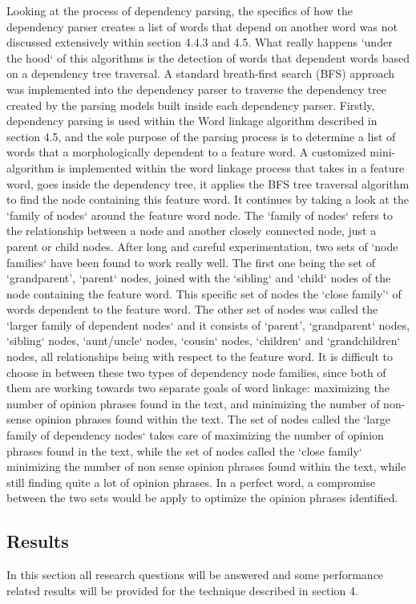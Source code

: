 \documentclass{sig-alternate}
\begin{document}
Looking at the process of dependency parsing, the specifics of how the dependency parser creates a list of words that depend on another word was not discussed extensively within section 4.4.3 and 4.5. What really happens `under the hood` of this algorithms is the detection of words that dependent words based on a dependency tree traversal. A standard breath-first search (BFS) approach was implemented into the dependency parser to traverse the dependency tree created by the parsing models built inside each dependency parser. Firstly, dependency parsing is used within the Word linkage algorithm described in section 4.5, and the sole purpose of the parsing process is to determine a list of words that a morphologically dependent to a feature word. A customized mini-algorithm is implemented within the word linkage process that takes in a feature word, goes inside the dependency tree, it applies the BFS tree traversal algorithm to find the node containing this feature word. It continues by taking a look at the `family of nodes` around the feature word node. The `family of nodes` refers to the relationship between a node and another closely connected node, just a parent or child nodes. After long and careful experimentation, two sets of `node families` have been found to work really well. The first one being the set of `grandparent', `parent` nodes, joined with the `sibling` and `child` nodes of the node containing the feature word. This specific set of nodes the `close family'` of words dependent to the feature word. The other set of nodes was called the `larger family of dependent nodes` and it consists of `parent', `grandparent` nodes, `sibling` nodes, `aunt/uncle` nodes, `cousin` nodes, `children` and `grandchildren` nodes, all relationships being with respect to the feature word. It is difficult to choose in between these two types of dependency node families, since both of them are working towards two separate goals of word linkage: maximizing the number of opinion phrases found in the text, and minimizing the number of non-sense opinion phrases found within the text. The set of nodes called the `large family of dependency nodes` takes care of maximizing the number of opinion phrases found in the text, while the set of nodes called the `close family` minimizing the number of non sense opinion phrases found within the text, while still finding quite a lot of opinion phrases. In a perfect word, a compromise between the two sets would be apply to optimize the opinion phrases identified. 

\subsection{Results}
In this section all research questions will be answered and some performance related results will be provided for the technique described in section 4. 
\end{document}
